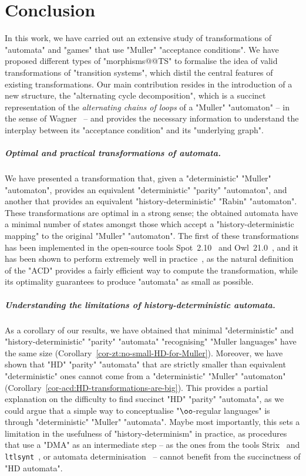\documentclass{theoretics}
\begin{document}
 	
	\section{Conclusion}\label{section:conclusion}
	In this work, we have carried out an extensive study of transformations of "automata" and "games" that use "Muller" "acceptance conditions". We have proposed different types of "morphisms@@TS" to formalise the idea of valid transformations of "transition systems", which distil the central features of existing transformations. Our main contribution resides in the introduction of a new structure, the "alternating cycle decomposition", which is a succinct representation of the \emph{alternating chains of loops} of a "Muller" "automaton" -- in the sense of Wagner~\cite{Wagner1979omega} -- and provides the necessary information to understand the interplay between its "acceptance condition" and its "underlying graph".


\subparagraph*{Optimal and practical transformations of automata.} We have presented a transformation that, given a "deterministic" "Muller" "automaton",  provides an equivalent "deterministic" "parity" "automaton", and another that provides an equivalent "history-deterministic" "Rabin" "automaton". These transformations are optimal in a strong sense; the obtained automata have a minimal number of states amongst those which accept a "history-deterministic mapping" to the original "Muller" "automaton".
The first of these transformations has been implemented in the open-source tools Spot~2.10~\cite{Spot2.10CAV22} and Owl~21.0~\cite{KMS18Owl}, and it has been shown to perform extremely well in practice~\cite{CDMRS22Tacas}, as the natural definition of the "ACD" provides a fairly efficient way to compute the transformation, while its optimality guarantees to produce "automata" as small as possible. 


\subparagraph*{Understanding the limitations of history-deterministic automata.} As a corollary of our results, we have obtained that minimal "deterministic" and "history-deterministic" "parity" "automata" "recognising" "Muller languages" have the same size (Corollary~\ref{cor-zt:no-small-HD-for-Muller}). Moreover, we have shown that "HD" "parity" "automata" that are strictly smaller than equivalent "deterministic" ones cannot come from a "deterministic" "Muller" "automaton" (Corollary~\ref{cor-acd:HD-transformations-are-big}). This provides a partial explanation on the difficulty to find succinct "HD" "parity" "automata", as we could argue that a simple way to conceptualise "$\oo$-regular languages" is through "deterministic" "Muller" "automata". 
Maybe most importantly, this sets a limitation in the usefulness of "history-determinism" in practice, as procedures that use a "DMA" as an intermediate step -- as the ones from the tools Strix~\cite{LMS20SynthesisLTL} and \texttt{ltlsynt}~\cite{MichaudColange18Synt}, or  automata determinisation~\cite{Piterman2006fromNDBuchi,Schewe2009tighter,LodingP19} -- cannot benefit from the succinctness of "HD automata".
\end{document}
